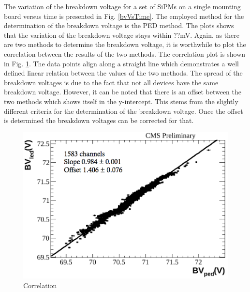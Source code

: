 The variation of the breakdown voltage for a set of SiPMs on a single mounting board versus time is presented in Fig. \ref{bvVsTime}. The employed method for the determination of the breakdown voltage is the PED method. The plots shows that the variation of the breakdown voltage stays within ??mV.
Again, as there are two methods to determine the breakdown voltage, it is worthwhile to plot the correlation between the results of the two methods. The correlation plot is shown in Fig. \ref{bvCorr}. The data points align along a straight line which demonstrates a well defined linear relation between the values of the two methods. The spread of the breakdown voltages is due to the fact that not all devices have the same breakdown voltage. However, it can be noted that there is an offset between the two methods which shows itself in the y-intercept. This stems from the slightly different criteria for the determination of the breakdown voltage. Once the offset is determined the breakdown voltages can be corrected for that.
\begin{figure}
\centering
\begin{minipage}[t]{0.475\textwidth}
\includegraphics[width=\textwidth]{Figures/kuensken/bvCorrelation.png}
\end{minipage}
\hspace{0.5cm}
\begin{minipage}[t]{0.475\textwidth}
\caption{Correlation}
\label{bvCorr}
\end{minipage}
\end{figure}
